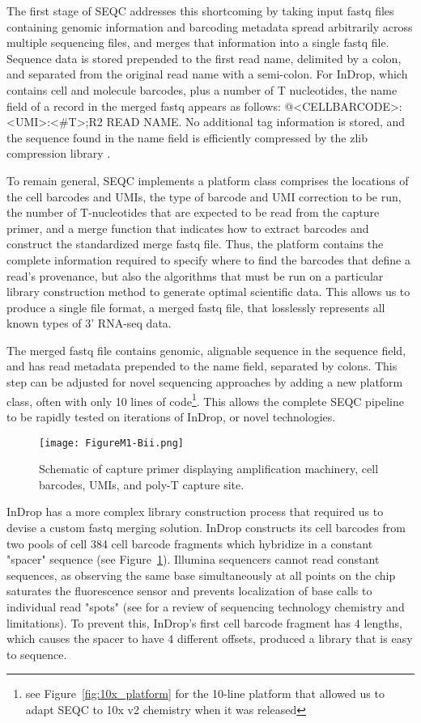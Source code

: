 The first stage of SEQC addresses this shortcoming by taking input fastq files containing genomic information and barcoding metadata spread arbitrarily across multiple sequencing files, and merges that information into a single fastq file. 
Sequence data is stored prepended to the first read name, delimited by a colon, and separated from the original read name with a semi-colon.
For InDrop, which contains cell and molecule barcodes, plus a number of T nucleotides, the name field of a record in the merged fastq appears as follows: {\mono @<CELLBARCODE>:<UMI>:<\#T>;R2 READ NAME}.
No additional tag information is stored, and the sequence found in the name field is efficiently compressed by the zlib compression library \citep{Gailly2004}.

To remain general, SEQC implements a platform class comprises the locations of the cell barcodes and UMIs, the type of barcode and UMI correction to be run, the number of T-nucleotides that are expected to be read from the capture primer, and a merge function that indicates how to extract barcodes and construct the standardized merge fastq file. 
Thus, the platform contains the complete information required to specify where to find the barcodes that define a read's provenance, but also the algorithms that must be run on a particular library construction method to generate optimal scientific data. This allows us to produce a single file format, a merged fastq file, that losslessly represents all known types of 3' RNA-seq data. 

The merged fastq file contains genomic, alignable sequence in the sequence field, and has read metadata prepended to the name field, separated by colons. This step can be adjusted for novel sequencing approaches by adding a new platform class, often with only 10 lines of code\footnote{see Figure~\ref{fig:10x_platform} for the 10-line platform that allowed us to adapt SEQC to 10x v2 chemistry when it was released}.
This allows the complete SEQC pipeline to be rapidly tested on iterations of InDrop, or novel technologies.

\begin{figure}
\centering
\texttt{[image: FigureM1-Bii.png]}
\caption{Schematic of capture primer displaying amplification machinery, cell barcodes, UMIs,
         and poly-T capture site.}
\label{fig:m1bii}
\end{figure}

InDrop has a more complex library construction process that required us to devise a custom fastq merging solution.
InDrop constructs its cell barcodes from two pools of cell 384 cell barcode fragments which hybridize in a constant "spacer" sequence (see Figure~\ref{fig:m1bii}).
Illumina sequencers cannot read constant sequences, as observing the same base simultaneously at all points on the chip saturates the fluorescence sensor and prevents localization of base calls to individual read "spots" (see \cite{Metzker2010} for a review of sequencing technology chemistry and limitations). 
To prevent this, InDrop's first cell barcode fragment has 4 lengths, which causes the spacer to have 4 different offsets, produced a library that is easy to sequence. 

